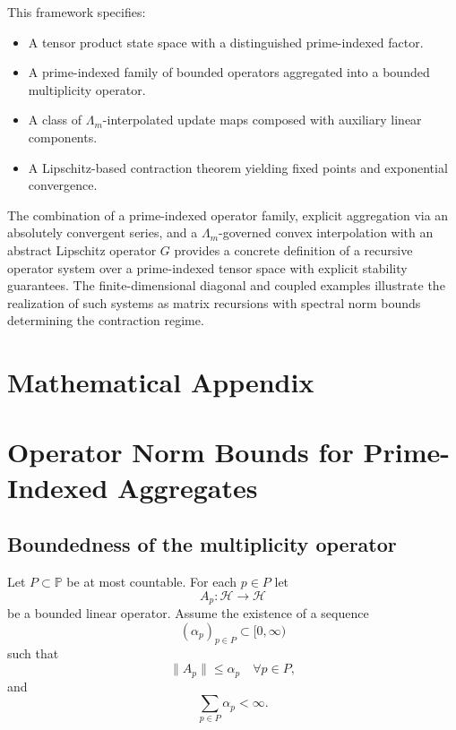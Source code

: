 \documentclass[11pt]{article}
\begin{document}
This framework specifies:

\begin{itemize}
  \item A tensor product state space with a distinguished prime-indexed factor.
  \item A prime-indexed family of bounded operators aggregated into a bounded multiplicity operator.
  \item A class of $\Lambda_m$-interpolated update maps composed with auxiliary linear components.
  \item A Lipschitz-based contraction theorem yielding fixed points and exponential convergence.
\end{itemize}

The combination of a prime-indexed operator family, explicit aggregation via an absolutely convergent series, and a $\Lambda_m$-governed convex interpolation with an abstract Lipschitz operator $G$ provides a concrete definition of a recursive operator system over a prime-indexed tensor space with explicit stability guarantees. The finite-dimensional diagonal and coupled examples illustrate the realization of such systems as matrix recursions with spectral norm bounds determining the contraction regime.

\appendix
\section*{Mathematical Appendix}

\section{Operator Norm Bounds for Prime-Indexed Aggregates}

\subsection{Boundedness of the multiplicity operator}

Let $P \subset \mathbb{P}$ be at most countable. For each $p \in P$ let
\[
  A_p : \mathcal{H} \to \mathcal{H}
\]
be a bounded linear operator. Assume the existence of a sequence
\[
  (\alpha_p)_{p \in P} \subset [0,\infty)
\]
such that
\begin{equation}\label{eq:A_p_bound_app}
  \|A_p\| \leq \alpha_p
  \quad \forall p \in P,
\end{equation}
and
\begin{equation}\label{eq:alpha_sum_app}
  \sum_{p \in P} \alpha_p < \infty.
\end{equation}
\end{document}
